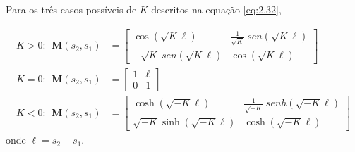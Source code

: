Para os três casos possíveis de $K$ descritos na equação \eqref{eq:2.32},
	
\begin{align}
	K>0: \ \ \boldsymbol{M}(s_2,s_1) &= \begin{bmatrix}
	\cos(\sqrt{K}\ell) & \frac{1}{\sqrt{K}}\ sen(\sqrt{K}\ell)\\
	-\sqrt{K}\ sen(\sqrt{K}\ell) & \cos(\sqrt{K}\ell)
	\end{bmatrix}\\
	K=0: \ \ \boldsymbol{M}(s_2,s_1) &= \begin{bmatrix}
		1 & \ell\\
		0 & 1
		\end{bmatrix}\\
	K<0: \ \ \boldsymbol{M}(s_2,s_1) &= \begin{bmatrix}
		\cosh(\sqrt{-K}\ell) & \frac{1}{\sqrt{-K}}\ senh(\sqrt{-K}\ell)\\
		\sqrt{-K}\sinh(\sqrt{-K}\ell) & \cosh(\sqrt{-K}\ell)
		\end{bmatrix}
\end{align}
onde $\ell = s_2-s_1$.
	

